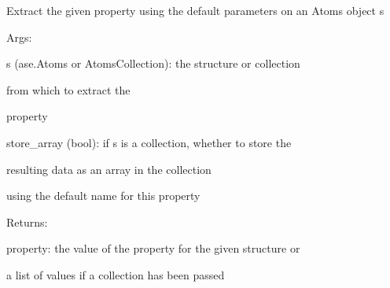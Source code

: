 \documentclass[letterpaper,10pt,english]{sphinxmanual}
\begin{document}
\begin{fulllineitems}
\begin{fulllineitems}
\label{doctree/soprano.properties.atomsproperty:soprano.properties.atomsproperty.AtomsProperty.get}
Extract the given property using the default parameters
on an Atoms object s

\begin{DUlineblock}{0em}
\item[] Args:
\item[]
\begin{DUlineblock}{\DUlineblockindent}
\item[] s (ase.Atoms or AtomsCollection): the structure or collection
\item[]
\begin{DUlineblock}{\DUlineblockindent}
\item[] from which to extract the
\item[] property
\end{DUlineblock}
\item[] store\_array (bool): if s is a collection, whether to store the
\item[]
\begin{DUlineblock}{\DUlineblockindent}
\item[] resulting data as an array in the collection
\item[] using the default name for this property
\item[] 
\end{DUlineblock}
\end{DUlineblock}
\end{DUlineblock}

\begin{DUlineblock}{0em}
\item[] Returns:
\item[]
\begin{DUlineblock}{\DUlineblockindent}
\item[] property: the value of the property for the given structure or
\item[]
\begin{DUlineblock}{\DUlineblockindent}
\item[] a list of values if a collection has been passed
\item[] 
\end{DUlineblock}
\end{DUlineblock}
\end{DUlineblock}

\end{fulllineitems}


\end{fulllineitems}
\end{document}
